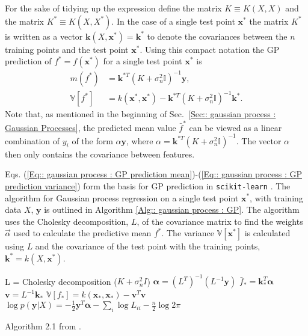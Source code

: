 \documentclass[twoside,english]{uiofysmaster}
\begin{document}
{For the sake of tidying up the expression define the matrix $K \equiv K(X, X)$ and the matrix $K^* \equiv K(X, X^*)$. In the case of a single test point $\textbf{x}^*$ the matrix $K^*$ is written as a vector $\textbf{k}(X, \textbf{x}^*) = \textbf{k}^*$ to denote the covariances between the $n$ training points and the test point $\textbf{x}^*$. Using this compact notation the GP prediction of $f^*=f(\textbf{x}^*)$ for a single test point $\textbf{x}^*$ is
\begin{align}
m(f^*) &= \textbf{k}^{*T}(K + \sigma_n^2\mathbb{I})^{-1} \textbf{y},\label{Eq:: gaussian process : GP prediction mean}\\
\mathbb{V}[f^*] &= k(\textbf{x}^*, \textbf{x}^*) - \textbf{k}^{*T}(K + \sigma_n^2 \mathbb{I})^{-1} \textbf{k}^*\label{Eq:: gaussian process : GP prediction variance}.
\end{align}
Note that, as mentioned in the beginning of Sec.~\ref{Sec:: gaussian process : Gaussian Processes}, the predicted mean value $\bar{f}^*$ can be viewed as a linear combination of $y_i$ of the form $\alpha \textbf{y}$, where $\alpha = \textbf{k}^{*T}(K + \sigma_n^2\mathbb{I})^{-1}$. The vector $\alpha$ then only contains the covariance between features.

Eqs. (\ref{Eq:: gaussian process : GP prediction mean})-(\ref{Eq:: gaussian process : GP prediction variance}) form the basis for GP prediction in \verb|scikit-learn|  \cite{scikit-learn}. The algorithm for Gaussian process regression on a single test point $\textbf{x}^*$, with training data $X$, $\textbf{y}$ is outlined in Algorithm \ref{Alg:: gaussian process : GP}. The algorithm uses the Cholesky decomposition, $L$, of the covariance matrix to find the weights $\vec{\alpha}$ used to calculate the predictive mean $f^*$. The variance $\mathbb{V}[\textbf{x}^*]$ is calculated using $L$ and the covariance of the test point with the training points, $\textbf{k}^* = k(X, \textbf{x}^*)$.

\begin{algorithm}
L = Cholesky decomposition ($K + \sigma_n^2 I$) \;
$\boldsymbol{\alpha} = (L^T)^{-1}(L^{-1} \textbf{y})$ \;
$\bar{f}_* = \textbf{k}_*^T \boldsymbol{\alpha}$ \;
$\textbf{v} = L^{-1} \textbf{k}_*$ \;
$\mathbb{V}[f_*] = k(\textbf{x}_*, \textbf{x}_*) - \textbf{v}^T \textbf{v}$ \;
$\log p(\textbf{y}|X) = - \frac{1}{2} \textbf{y}^T \boldsymbol{\alpha} - \sum_i \log L_{ii} - \frac{n}{2} \log 2 \pi$ \;
\caption{Algorithm 2.1 from \cite{rasmussen2006gaussian}.}
\label{Alg:: gaussian process : GP}
\end{algorithm}




}
\end{document}
